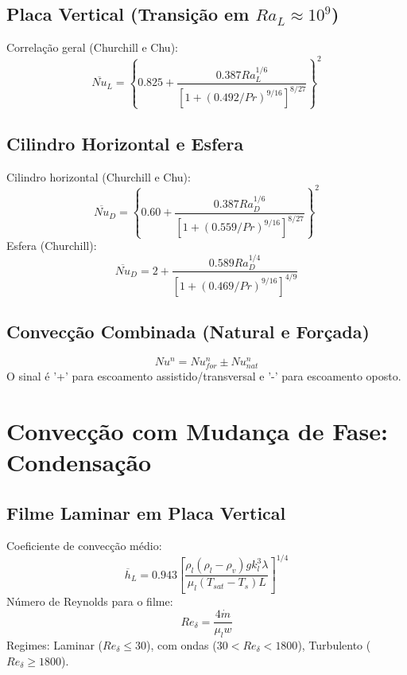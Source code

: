 \documentclass[12pt, a4paper]{article}
\begin{document}
\subsection{Placa Vertical (Transição em $Ra_L \approx 10^9$)}
Correlação geral (Churchill e Chu):
\begin{equation}
    \overline{Nu}_L = \left\{ 0.825 + \frac{0.387 Ra_L^{1/6}}{[1+(0.492/Pr)^{9/16}]^{8/27}} \right\}^2
\end{equation}

\subsection{Cilindro Horizontal e Esfera}
Cilindro horizontal (Churchill e Chu):
\begin{equation}
    \overline{Nu}_D = \left\{ 0.60 + \frac{0.387 Ra_D^{1/6}}{[1+(0.559/Pr)^{9/16}]^{8/27}} \right\}^2
\end{equation}
Esfera (Churchill):
\begin{equation}
    \overline{Nu}_D = 2 + \frac{0.589 Ra_D^{1/4}}{[1+(0.469/Pr)^{9/16}]^{4/9}}
\end{equation}

\subsection{Convecção Combinada (Natural e Forçada)}
\begin{equation}
    Nu^n = Nu_{for}^n \pm Nu_{nat}^n
\end{equation}
O sinal é '+' para escoamento assistido/transversal e '-' para escoamento oposto.

\newpage

\section{Convecção com Mudança de Fase: Condensação}

\subsection{Filme Laminar em Placa Vertical}
Coeficiente de convecção médio:
\begin{equation}
    \overline{h}_L = 0.943 \left[ \frac{\rho_l (\rho_l - \rho_v) g k_l^3 \lambda}{\mu_l (T_{sat} - T_s)L} \right]^{1/4}
\end{equation}
Número de Reynolds para o filme:
\begin{equation}
    Re_\delta = \frac{4 \dot{m}}{\mu_l w}
\end{equation}
Regimes: Laminar ($Re_\delta \le 30$), com ondas ($30 < Re_\delta < 1800$), Turbulento ($Re_\delta \ge 1800$).
\end{document}

